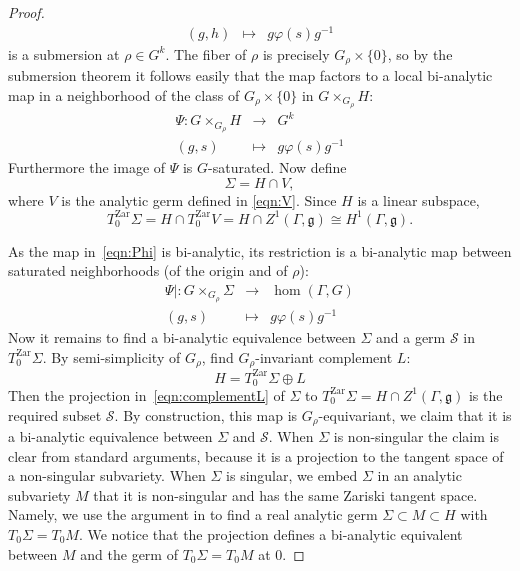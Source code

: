 \documentclass[a4paper,11pt]{article}
\begin{document}
\begin{proof}
$$\begin{array}{rcl}
 (g, h) & \mapsto & g \varphi(s) g^{-1}
 \end{array}
 $$
 is a submersion at $\rho\in G^k$. 
The fiber of $\rho$ is precisely
$G_\rho\times \{0\}$, so by the submersion theorem 
it follows easily that
the map factors to a local bi-analytic map in a neighborhood
of the class of $G_\rho\times \{0\}$ in  $G\times_{G_\rho}H$:
\begin{equation}
 \label{eqn:Phi}
\begin{array}{ccl}
\Psi\colon G\times_{G_\rho} H& \to &  G^k \\
 (g, s) & \mapsto & g \varphi(s) g^{-1}
\end{array} 
\end{equation}
Furthermore the image of $\Psi$ is 
$G$-saturated.
Now define
\begin{equation}
 \label{eqn:SigmaHV}
\Sigma=H\cap V, 
\end{equation}
where $V$ is the analytic germ defined in \eqref{eqn:V}.
Since $H$ is a linear subspace, 
\begin{equation}
 \label{eqn:TSigma}
T^{\mathrm{Zar}}_0\Sigma= H\cap T^{\mathrm{Zar}}_0V=
H\cap Z^1(\Gamma, \mathfrak{g})\cong H^1(\Gamma, 
\mathfrak g).
\end{equation}


As the map in~\eqref{eqn:Phi} is bi-analytic, its restriction is
a bi-analytic map between saturated  neighborhoods (of the origin and of $\rho$):
 \begin{equation}
 \label{eqn:Phirest}
\begin{array}{ccl}
\Psi\vert \colon G\times_{G_\rho} \Sigma& \to & \hom(\Gamma, G)   \\
 (g, s) & \mapsto & g \varphi(s) g^{-1}
\end{array} 
\end{equation}
Now it remains to find a bi-analytic equivalence between 
$\Sigma $ and a germ $\mathcal S$ in $T^{\mathrm{Zar}}_0\Sigma$. 
By semi-simplicity of $G_\rho$, find $G_\rho$-invariant complement $L$:
\begin{equation}
 \label{eqn:complementL}
H= T^{\mathrm{Zar}}_0\Sigma\oplus L
\end{equation}
Then the projection in~\eqref{eqn:complementL}  of $\Sigma   $ to
$T^{\mathrm{Zar}}_0\Sigma=H\cap Z^1(\Gamma, \mathfrak{g})$ is the required subset $\mathcal S$.
By construction, this map is $G_\rho$-equivariant, we claim that it is a bi-analytic equivalence
between $\Sigma$ and $\mathcal S$. When $\Sigma$ is non-singular the claim is clear from standard arguments,
because it is a projection to the tangent space of a non-singular subvariety. When $\Sigma$ is singular, we embed $\Sigma$ in an analytic subvariety $M$ that it is non-singular and has the same Zariski tangent space. Namely,
we use the argument in \cite[Theorem~V.A.14]{GunningRossi} to find a real analytic
germ $\Sigma\subset M\subset H$ with $T_0\Sigma=T_0 M$. We notice that
the projection defines a bi-analytic equivalent between $M$ and the germ of  $T_0\Sigma=T_0 M$ at $0$.


\end{proof}
\end{document}
